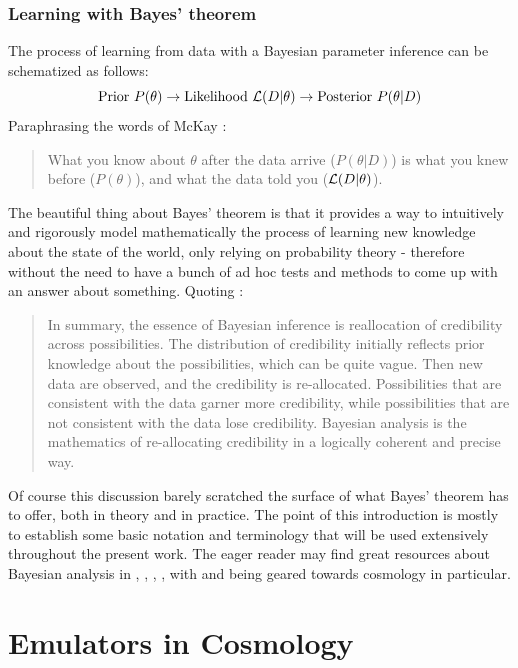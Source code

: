 \subsubsection{Learning with Bayes' theorem}
The process of learning from data with a Bayesian parameter inference can be schematized as follows:
\begin{equation*}
    \text{Prior} \ P(\theta) \to \text{Likelihood} \ \L(D|\theta) \to \text{Posterior} \ P(\theta|D)
\end{equation*}
Paraphrasing the words of McKay \cite{mckay}:
\begin{quote}
    What you know about $\theta$ after the data arrive ($P(\theta|D)$) is what you knew before ($P(\theta)$), and what the data told you ($\mathcal{L}(D|\theta)$).
\end{quote}
The beautiful thing about Bayes' theorem is that it provides a way to intuitively and rigorously model mathematically the process of learning new knowledge about the state of the world, only relying on probability theory - therefore without the need to have a bunch of ad hoc tests and methods to come up with an answer about something.
Quoting \cite{doing_bayesian_data_analysis}:
\begin{quote}
    In summary, the essence of Bayesian inference is reallocation of credibility across possibilities. The distribution of credibility initially reflects prior knowledge about the possibilities, which can be quite vague. Then new data are observed, and the credibility is re-allocated. Possibilities that are consistent with the data garner more credibility, while possibilities that are not consistent with the data lose credibility. Bayesian analysis is the mathematics of re-allocating credibility in a logically coherent and precise way.
\end{quote}
Of course this discussion barely scratched the surface of what Bayes' theorem has to offer, both in theory and in practice. The point of this introduction is mostly to establish some basic notation and terminology that will be used extensively throughout the present work. The eager reader may find great resources about Bayesian analysis in \cite{mckay}, \cite{doing_bayesian_data_analysis}, \cite{jaynes_mysteries}, \cite{data_analysis_bayesian}, with \cite{trotta_sito} and \cite{trotta2017bayesian} being geared towards cosmology in particular.

\section{Emulators in Cosmology}
